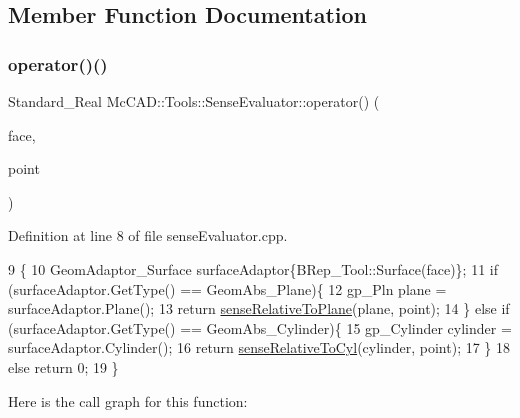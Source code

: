 \subsection{Member Function Documentation}
\mbox{\label{classMcCAD_1_1Tools_1_1SenseEvaluator_a3216ae79c31b9bebaf883870b61550b4}} 
\subsubsection{\texorpdfstring{operator()()}{operator()()}\hspace{0.1cm}{\footnotesize\ttfamily [1/2]}}
{\footnotesize\ttfamily Standard\+\_\+\+Real Mc\+C\+A\+D\+::\+Tools\+::\+Sense\+Evaluator\+::operator() (\begin{DoxyParamCaption}\item[{const Topo\+D\+S\+\_\+\+Face \&}]{face,  }\item[{const gp\+\_\+\+Pnt \&}]{point }\end{DoxyParamCaption})}



Definition at line 8 of file sense\+Evaluator.\+cpp.


\begin{DoxyCode}
9                                                              \{
10     GeomAdaptor\_Surface surfaceAdaptor\{BRep\_Tool::Surface(face)\};
11     \textcolor{keywordflow}{if} (surfaceAdaptor.GetType() == GeomAbs\_Plane)\{
12         gp\_Pln plane = surfaceAdaptor.Plane();
13         \textcolor{keywordflow}{return} \hyperlink{classMcCAD_1_1Tools_1_1SenseEvaluator_a1ca5a16c81eae36f9b6fdf4beef7d21e}{senseRelativeToPlane}(plane, point);
14     \} \textcolor{keywordflow}{else} \textcolor{keywordflow}{if} (surfaceAdaptor.GetType() == GeomAbs\_Cylinder)\{
15         gp\_Cylinder cylinder = surfaceAdaptor.Cylinder();
16         \textcolor{keywordflow}{return} \hyperlink{classMcCAD_1_1Tools_1_1SenseEvaluator_ac37a41bbc0027d8821d2cd0d4cd9a542}{senseRelativeToCyl}(cylinder, point);
17     \}
18     \textcolor{keywordflow}{else} \textcolor{keywordflow}{return} 0;
19 \}
\end{DoxyCode}
Here is the call graph for this function\+:
\mbox{\label{classMcCAD_1_1Tools_1_1SenseEvaluator_a3216ae79c31b9bebaf883870b61550b4}} 
